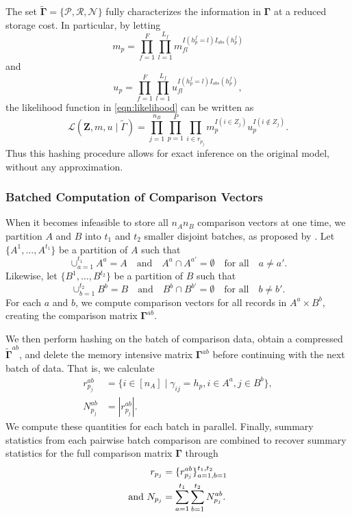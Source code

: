 \documentclass[12pt,letterpaper]{article}
\newcommand{\1}[1]{\mathbb{I}\!\left[#1\right]} %
\begin{document}
The set $\tilde{\bm{\Gamma}}=\{ \mathcal{P}, \mathcal{R},\mathcal{N}\}$ fully characterizes the information in $\bm{\Gamma}$ at a reduced storage cost. In particular, by letting 
\[
m_p = \prod_{f=1}^F\prod_{l=1}^{L_f} m_{fl}^{I(h_p^{f}=l)I_{obs}(h_p^{f})}
\]
and
\[
u_p = \prod_{f=1}^F\prod_{l=1}^{L_f} u_{fl}^{I(h_p^{f}=l)I_{obs}(h_p^{f})},
\]
the likelihood function in \eqref{eqn:likelihood} can be written as
\begin{equation}
	\label{eq:likelihood-hash}
	\mathcal{L}(\bm{Z}, m,u\mid\tilde{\Gamma})=\prod_{j=1}^{n_B}\prod_{p=1}^{P}\prod_{i\in r_{p_j}}m_p^{I(i \in Z_j)}u_{p}^{I(i \notin Z_j)}.
\end{equation}
Thus this hashing procedure allows for exact inference on the original model, without any approximation.

\subsubsection{Batched Computation of Comparison Vectors} \label{app:batching}
When it becomes infeasible to store all $n_A  n_B$ comparison vectors at one time, we partition $A$ and $B$ into $t_1$ and $t_2$ smaller disjoint batches, as proposed by \cite{kundinger_2023}. Let $\{A^1, \dots, A^{t_1}\}$ be a partition of $A$ such that 
$$\cup_{a=1}^{t_1} A^a = A \quad \text{and} \quad A^a \cap A^{a'}=\emptyset \quad \text{for all} \quad a \neq a'.$$  Likewise, let $\{B^1, \dots, B^{t_2}\}$ be a partition of $B$ such that 
$$\cup_{b=1}^{t_2} B^b = B \quad \text{and} \quad B^b \cap B^{b'}=\emptyset \quad \text{for all} \quad b \neq b'.$$ For each $a$ and $b$, we compute comparison vectors for all records in $A^a \times B^b$, creating the comparison matrix $\bm{\Gamma}^{ab}$. 

We then perform hashing on the batch of comparison data, obtain a compressed $\tilde{\bm{\Gamma}}^{ab}$, and delete the memory intensive matrix $\bm{\Gamma}^{ab}$ before continuing with the next batch of data. That is, we calculate
\begin{align*}
	r_{p_j}^{ab} &= \{i \in [n_A]\mid \gamma_{ij} = h_p, i\in A^a, j \in B^b\}, \\
	N_{p_j}^{ab} &= |r_{p_j}^{ab}|.
\end{align*}
We compute these quantities for each batch in parallel. Finally, summary statistics from each pairwise batch comparison are combined to recover summary statistics for the full comparison matrix $\bm{\Gamma}$ through
\begin{align}
	r_{p_j} &= \{r_{p_j}^{ab}\}_{a=1, b=1}^{t_1,t_2} \label{eq:rpj}  \\
	\text{and } N_{p_j} &= \sum_{a = 1}^{t_1} \sum_{b = 1}^{t_2} N_{p_j}^{ab}. \notag
\end{align}
\end{document}

